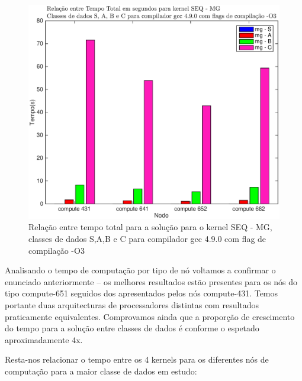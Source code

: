\documentclass[conference,compsoc]{IEEEtran}
\begin{document}
\begin{figure}[H]
\centering
\includegraphics[width=1.1\columnwidth]{EPS/SEQ/TEMPO_seq-mg.eps}
\caption{Relação entre tempo total para a solução para o kernel SEQ - MG, classes de dados S,A,B e C para  compilador gcc 4.9.0 com flag de compilação -O3}
\label{tempo_seq_mg_c}
\end{figure}

Analisando o tempo de computação por tipo de nó voltamos a confirmar o enunciado anteriormente -- os melhores resultados estão presentes para os nós do tipo compute-651 seguidos dos apresentados pelos nós compute-431. Temos portante duas arquitecturas de processadores distintas com resultados praticamente equivalentes. Comprovamos ainda que a proporção de crescimento do tempo para a solução entre classes de dados é conforme o espetado aproximadamente 4x. \par 
Resta-nos relacionar o tempo entre os 4 kernels para os diferentes nós de computação para a maior classe de dados em estudo:
\end{document}
